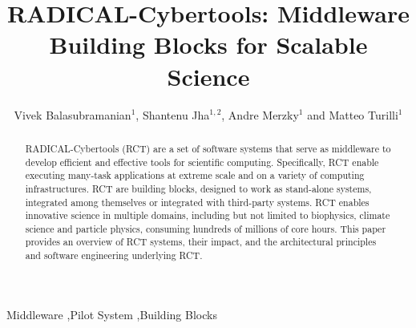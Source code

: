 \documentclass[preprint,12pt, a4paper]{elsarticle}
\begin{document}
\begin{frontmatter}

\title{RADICAL-Cybertools: Middleware Building Blocks for Scalable Science}

\author{Vivek Balasubramanian$^1$, Shantenu Jha$^{1,2}$, Andre Merzky$^1$ and Matteo Turilli$^1$}
\address{$^1$Electrical \& Computer Engineering, Rutgers University, Piscataway, NJ 08854, USA, $^2$Brookhaven National Laboratory}

\begin{abstract}

RADICAL-Cybertools (RCT) are a set of software systems that serve as middleware to develop efficient and effective tools for scientific computing. Specifically, RCT enable executing many-task applications at extreme scale and on a variety of computing infrastructures. RCT are building blocks, designed to work as stand-alone systems, integrated among themselves or integrated with third-party systems. RCT enables innovative science in multiple domains, including but not limited to biophysics, climate science and particle physics, consuming hundreds of millions of core hours. This paper provides an overview of RCT systems, their impact, and the architectural principles and software engineering underlying RCT\@.
\end{abstract}

\begin{keyword}

Middleware \sep Pilot System \sep Building Blocks



\end{keyword}

\end{frontmatter}


\end{document}
